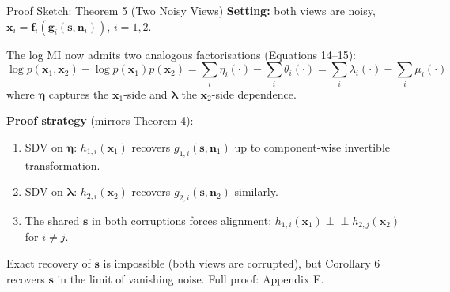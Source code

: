 \documentclass[aspectratio=169, 10pt]{beamer}
\begin{document}
\begin{frame}{Proof Sketch: Theorem 5 (Two Noisy Views)}
  \textbf{Setting:} both views are noisy,
  $\mathbf{x}_i=\mathbf{f}_i(\mathbf{g}_i(\mathbf{s},\mathbf{n}_i))$, $i=1,2$.

  \medskip
  The log MI now admits two analogous factorisations (Equations 14--15):
  \[
    \log p(\mathbf{x}_1,\mathbf{x}_2) - \log p(\mathbf{x}_1)p(\mathbf{x}_2)
    = \sum_i \eta_i(\cdot) - \sum_i \theta_i(\cdot)
    = \sum_i \lambda_i(\cdot) - \sum_i \mu_i(\cdot)
  \]
  where $\boldsymbol{\eta}$ captures the $\mathbf{x}_1$-side and $\boldsymbol{\lambda}$
  the $\mathbf{x}_2$-side dependence.

  \medskip
  \textbf{Proof strategy} (mirrors Theorem 4):
  \begin{enumerate}
    \item SDV on $\boldsymbol{\eta}$: $h_{1,i}(\mathbf{x}_1)$ recovers
          $g_{1,i}(\mathbf{s},\mathbf{n}_1)$ up to component-wise invertible transformation.
    \item SDV on $\boldsymbol{\lambda}$: $h_{2,i}(\mathbf{x}_2)$ recovers
          $g_{2,i}(\mathbf{s},\mathbf{n}_2)$ similarly.
    \item The shared $\mathbf{s}$ in both corruptions forces alignment:
          $h_{1,i}(\mathbf{x}_1)\perp\!\!\!\perp h_{2,j}(\mathbf{x}_2)$ for $i\neq j$.
  \end{enumerate}

  \medskip
  Exact recovery of $\mathbf{s}$ is impossible (both views are corrupted), but
  Corollary 6 recovers $\mathbf{s}$ in the limit of vanishing noise.
  Full proof: Appendix E.
\end{frame}
\end{document}
